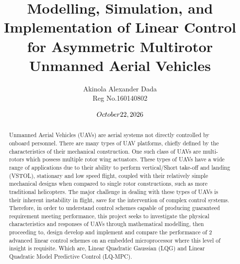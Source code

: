 \documentclass[12pt,a4paper,twoside]{report}
\title{ Modelling, Simulation, and Implementation of Linear Control for Asymmetric Multirotor Unmanned Aerial Vehicles}
\author{Akinola Alexander Dada \\ Reg No.160140802}
\date{$\today$}
\begin{document}
		
	\maketitle
	
	\newpage
	
	\tableofcontents
	
	\newpage
	
	\listoffigures
	
	\newpage
	\begin{abstract}
		Unmanned Aerial Vehicles (UAVs) are aerial systems not directly controlled by onboard personnel. There are many types of UAV platforms, chiefly defined by the characteristics of their mechanical construction. One such class of UAVs are multi-rotors which possess multiple rotor wing actuators. These types of UAVs have a wide range of applications due to their ability to perform vertical/Short take-off and landing (VSTOL), stationary and low speed flight, coupled with their relatively simple mechanical designs when compared to single rotor constructions, such as more traditional helicopters. The major challenge in dealing with these types of UAVs is their inherent instability in flight, save for the intervention of complex control systems. Therefore, in order to understand control schemes capable of  producing guaranteed requirement meeting performance, this project seeks to investigate the physical characteristics and responses of UAVs through mathematical modelling, then proceeding to, design develop and implement and compare the performance of 2 advanced linear control schemes on an embedded microprocessor where this level of insight is requisite. Which are, Linear Quadratic Gaussian (LQG) and Linear Quadratic Model Predictive Control (LQ-MPC). 
	\end{abstract}
	\newpage
	
\end{document}
